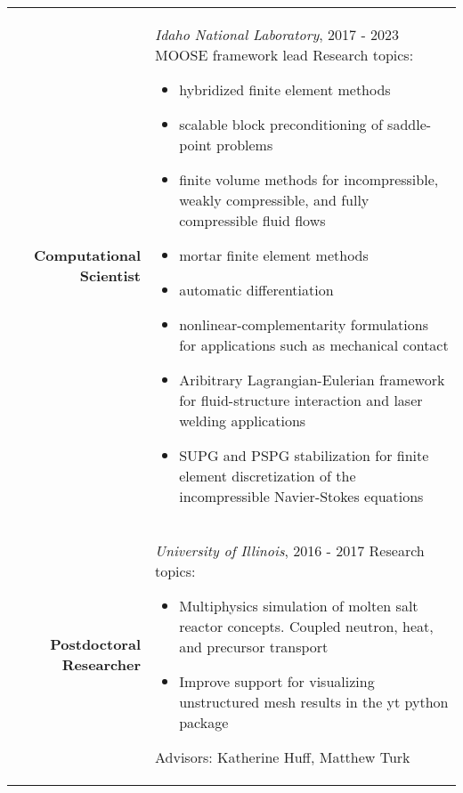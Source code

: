 \documentclass[a4paper,10pt]{article} %
\begin{document}
\begin{table}[H]
  \begin{tabularx}{\textwidth}{r>{\raggedright\arraybackslash}X}

    \textbf{Computational Scientist} & \textit{Idaho National Laboratory}, \textsc{2017 - 2023}\newline
    MOOSE framework lead\newline
    Research topics:
    \begin{itemize}
    \item hybridized finite element methods
    \item scalable block preconditioning of saddle-point problems
    \item finite volume methods for incompressible, weakly compressible, and
      fully compressible fluid flows
    \item mortar finite element methods
    \item automatic differentiation
    \item nonlinear-complementarity formulations for applications such as mechanical contact
    \item Aribitrary Lagrangian-Eulerian framework for fluid-structure interaction and laser welding applications
    \item SUPG and PSPG stabilization for finite element discretization of the incompressible Navier-Stokes
      equations
    \end{itemize}\\

    \textbf{Postdoctoral Researcher} & \textit{University of Illinois}, \textsc{2016 - 2017} \newline
    Research topics:
    \begin{itemize}
    \item Multiphysics simulation of molten salt reactor concepts. Coupled neutron, heat, and precursor transport
    \item Improve support for visualizing unstructured mesh results in the yt python package
    \end{itemize}
    Advisors: Katherine Huff, Matthew Turk\\

  \end{tabularx}
\end{table}

\end{document}
